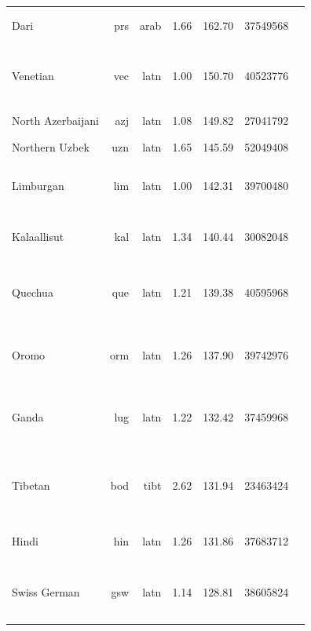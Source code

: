 \documentclass[11pt]{article}
\begin{document}
\begin{center}
\begin{longtable}[width=0.9\textwidth]{|lrrrrrl|}
Dari & prs & arab & 1.66 & 162.70 & 37549568 & {\color{nllb}\rule{3.97cm}{8pt}}{\color{glot500}\rule{0.029999999999999805cm}{8pt}} \\ 
Venetian & vec & latn & 1.00 & 150.70 & 40523776 & {\color{oscar}\rule{0.0cm}{8pt}}{\color{nllb}\rule{1.4cm}{8pt}}{\color{madlad400}\rule{0.86cm}{8pt}}{\color{glot500}\rule{1.34cm}{8pt}}{\color{other}\rule{0.40000000000000036cm}{8pt}} \\ 
North Azerbaijani & azj & latn & 1.08 & 149.82 & 27041792 & {\color{glot500}\rule{4.0cm}{8pt}} \\ 
Northern Uzbek & uzn & latn & 1.65 & 145.59 & 52049408 & {\color{nllb}\rule{4.0cm}{8pt}} \\ 
Limburgan & lim & latn & 1.00 & 142.31 & 39700480 & {\color{nllb}\rule{1.64cm}{8pt}}{\color{glot500}\rule{1.83cm}{8pt}}{\color{other}\rule{0.5300000000000002cm}{8pt}} \\ 
Kalaallisut & kal & latn & 1.34 & 140.44 & 30082048 & {\color{madlad400}\rule{3.34cm}{8pt}}{\color{glot500}\rule{0.55cm}{8pt}}{\color{other}\rule{0.11000000000000032cm}{8pt}} \\ 
Quechua & que & latn & 1.21 & 139.38 & 40595968 & {\color{oscar}\rule{0.0cm}{8pt}}{\color{nllb}\rule{2.66cm}{8pt}}{\color{madlad400}\rule{0.21cm}{8pt}}{\color{glot500}\rule{0.32cm}{8pt}}{\color{other}\rule{0.81cm}{8pt}} \\ 
Oromo & orm & latn & 1.26 & 137.90 & 39742976 & {\color{nllb}\rule{1.11cm}{8pt}}{\color{madlad400}\rule{0.92cm}{8pt}}{\color{glot500}\rule{1.31cm}{8pt}}{\color{other}\rule{0.6599999999999997cm}{8pt}} \\ 
Ganda & lug & latn & 1.22 & 132.42 & 37459968 & {\color{nllb}\rule{1.62cm}{8pt}}{\color{madlad400}\rule{0.85cm}{8pt}}{\color{glot500}\rule{1.33cm}{8pt}}{\color{other}\rule{0.19999999999999973cm}{8pt}} \\ 
Tibetan & bod & tibt & 2.62 & 131.94 & 23463424 & {\color{oscar}\rule{1.42cm}{8pt}}{\color{nllb}\rule{0.07cm}{8pt}}{\color{madlad400}\rule{0.96cm}{8pt}}{\color{glot500}\rule{1.09cm}{8pt}}{\color{other}\rule{0.45999999999999996cm}{8pt}} \\ 
Hindi & hin & latn & 1.26 & 131.86 & 37683712 & {\color{madlad400}\rule{2.98cm}{8pt}}{\color{glot500}\rule{1.02cm}{8pt}} \\ 
Swiss German & gsw & latn & 1.14 & 128.81 & 38605824 & {\color{oscar}\rule{0.1cm}{8pt}}{\color{madlad400}\rule{2.62cm}{8pt}}{\color{glot500}\rule{0.82cm}{8pt}}{\color{other}\rule{0.45999999999999996cm}{8pt}} \\ 

\end{longtable}
\end{center}
\end{document}
